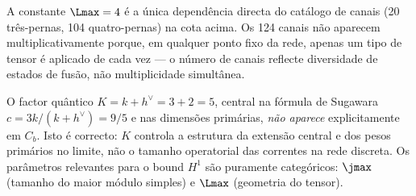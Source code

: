 \begin{remark}\label{rem:canais}
A constante $\Lmax = 4$ é a única dependência directa do catálogo de
canais (20 três-pernas, 104 quatro-pernas) na cota acima. Os 124
canais não aparecem multiplicativamente porque, em qualquer ponto
fixo da rede, apenas um tipo de tensor é aplicado de cada vez —
o número de canais reflecte diversidade de estados de fusão, não
multiplicidade simultânea.
\end{remark}

\begin{remark}[Comparação com $K = k + h^{\vee} = 5$]\label{rem:K5}
O factor quântico $K = k + h^{\vee} = 3 + 2 = 5$, central na fórmula
de Sugawara $c = 3k/(k+h^{\vee}) = 9/5$ e nas dimensões primárias,
\emph{não aparece} explicitamente em $C_b$. Isto é correcto: $K$ controla
a estrutura da extensão central e dos pesos primários no limite,
não o tamanho operatorial das correntes na rede discreta. Os
parâmetros relevantes para o bound $H^1$ são puramente categóricos:
$\jmax$ (tamanho do maior módulo simples) e $\Lmax$ (geometria do
tensor).
\end{remark}
